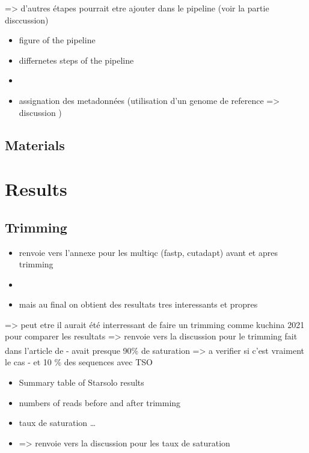 \documentclass[
  11pt,
  a4paper,
]{report}
\providecommand{\tightlist}{%
  \setlength{\itemsep}{0pt}\setlength{\parskip}{0pt}}\usepackage{longtable,booktabs,array}
\begin{document}
=\textgreater{} d'autres étapes pourrait etre ajouter dans le pipeline
(voir la partie disccussion)

\begin{itemize}
\tightlist
\item
  figure of the pipeline
\item
  differnetes steps of the pipeline
\item
\item
  assignation des metadonnées (utilisation d'un genome de reference
  =\textgreater{} discussion )
\end{itemize}

\section{Materials}\label{materials}


\chapter{Results}\label{results}

\section{Trimming}\label{trimming}

\begin{itemize}
\tightlist
\item
  renvoie vers l'annexe pour les multiqc (fastp, cutadapt) avant et
  apres trimming
\item
\item
  mais au final on obtient des resultats tres interessants et propres
\end{itemize}

=\textgreater{} peut etre il aurait été interressant de faire un
trimming comme kuchina 2021 pour comparer les resultats =\textgreater{}
renvoie vers la discussion pour le trimming fait dans l'article
de\textsuperscript{} - avait presque 90\%
de saturation =\textgreater{} a verifier si c'est vraiment le cas - et
10 \% des sequences avec TSO

\begin{itemize}
\tightlist
\item
  Summary table of Starsolo results
\item
  numbers of reads before and after trimming
\item
  taux de saturation \ldots{}
\item
  =\textgreater{} renvoie vers la discussion pour les taux de saturation
\end{itemize}
\end{document}
